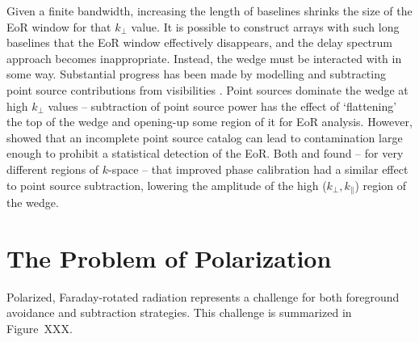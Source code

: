 Given a finite bandwidth, increasing the length of baselines shrinks the size of the EoR window for that $k_{\perp}$ value. It is possible to construct arrays with such long baselines that the EoR window effectively disappears, and the delay spectrum approach becomes inappropriate. Instead, the wedge must be interacted with in some way. Substantial progress has been made by modelling and subtracting point source contributions from visibilities \citep[e.g.][]{Patil.17}. Point sources dominate the wedge at high $k_{\perp}$ values \citep[e.g.][]{Trott.12} -- subtraction of point source power has the effect of `flattening' the top of the wedge and opening-up some region of it for EoR analysis. However, \cite{Barry.16} showed that an incomplete point source catalog can lead to contamination large enough to prohibit a statistical detection of the EoR.
Both \cite{Kohn.16} and \cite{Patil.17} found -- for very different regions of $k$-space -- that improved phase calibration had a similar effect to point source subtraction, lowering the amplitude of the high ($k_{\perp},k_{\parallel}$) region of the wedge.

\section{The Problem of Polarization}
\label{sec:eor_window_problem_of_pol}
Polarized, Faraday-rotated radiation represents a challenge for both foreground avoidance and subtraction strategies. This challenge is summarized in Figure~XXX.

